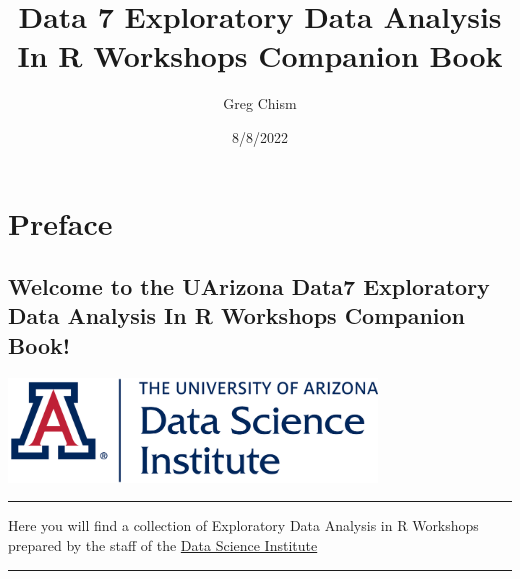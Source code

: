 \documentclass[
  letterpaper,
  DIV=11,
  numbers=noendperiod]{scrreprt}
\title{Data 7 Exploratory Data Analysis In R Workshops Companion Book}
\author{Greg Chism}
\date{8/8/2022}
\renewcommand*\contentsname{Table of contents}
\newcommand\contentsname{Table of contents}
\begin{document}
\maketitle
\ifdefined\Shaded\renewenvironment{Shaded}{\begin{tcolorbox}[sharp corners, borderline west={3pt}{0pt}{shadecolor}, boxrule=0pt, breakable, frame hidden, interior hidden, enhanced]}{\end{tcolorbox}}\fi

\renewcommand*\contentsname{Table of contents}
{
\hypersetup{linkcolor=}
\setcounter{tocdepth}{2}
\tableofcontents
}

\hypertarget{preface}{%
\chapter*{Preface}\label{preface}}

\hypertarget{welcome-to-the-uarizona-data7-exploratory-data-analysis-in-r-workshops-companion-book}{%
\section*{Welcome to the UArizona Data7 Exploratory Data Analysis In R
Workshops Companion
Book!}\label{welcome-to-the-uarizona-data7-exploratory-data-analysis-in-r-workshops-companion-book}}

\includegraphics[width=3.85417in,height=\textheight]{./images/DataScienceInstitute_ALTERNATE.png}

\begin{center}\rule{0.5\linewidth}{0.5pt}\end{center}

Here you will find a collection of Exploratory Data Analysis in R
Workshops prepared by the staff of the
\href{https://datascience.arizona.edu/}{Data Science Institute}

\begin{center}\rule{0.5\linewidth}{0.5pt}\end{center}
\end{document}
